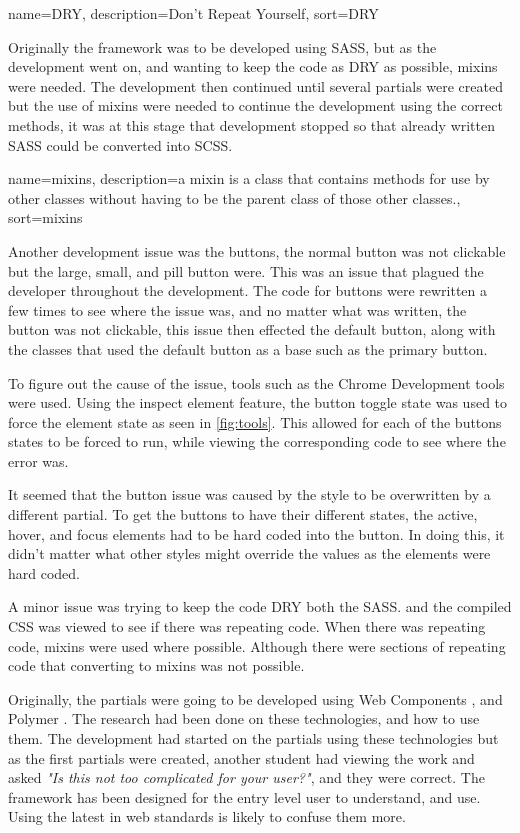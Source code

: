 {
  name={DRY},
  description={Don't Repeat Yourself},
  sort=DRY
}

Originally the framework was to be developed using \gls{SASS}, but as the development went on, and wanting to keep the code as \gls{DRY} as possible, \gls{mixins} were needed. The development then continued until several partials were created but the use of \gls{mixins} were needed to continue the development using the correct methods, it was at this stage that development stopped so that already written \gls{SASS} could be converted into \gls{SCSS}. 

{
  name={mixins},
  description={a mixin is a class that contains methods for use by other classes without having to be the parent class of those other classes.},
  sort=mixins
}

Another development issue was the buttons, the normal button was not clickable but the large, small, and pill button were. This was an issue that plagued the developer throughout the development. The code for buttons were rewritten a few times to see where the issue was, and no matter what was written, the button was not clickable, this issue then effected the default button, along with the classes that used the default button as a base such as the primary button. 

To figure out the cause of the issue, tools such as the Chrome Development tools were used. Using the inspect element feature, the button toggle state was used to force the element state as seen in \ref{fig:tools}. This allowed for each of the buttons states to be forced to run, while viewing the corresponding code to see where the error was. 

It seemed that the button issue was caused by the style to be overwritten by a different partial. To get the buttons to have their different states, the active, hover, and focus elements had to be hard coded into the button. In doing this, it didn't matter what other styles might override the values as the elements were hard coded.

A minor issue was trying to keep the code DRY both the SASS. and the compiled CSS was viewed to see if there was repeating code. When there was repeating code, \gls{mixins} were used where possible. Although there were sections of repeating code that converting to \gls{mixins} was not possible. 

Originally, the partials were going to be developed using Web Components \citep{Web17}, and Polymer \citep{Google17b}. The research had been done on these technologies, and how to use them. The development had started on the partials using these technologies but as the first partials were created, another student had viewing the work and asked \textit{"Is this not too complicated for your user?"}, and they were correct. The framework has been designed for the entry level user to understand, and use. Using the latest in web standards is likely to confuse them more.


